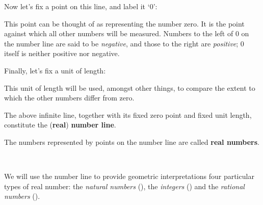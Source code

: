 Now let's fix a point on this line, and label it `$0$':
\begin{center}
\end{center}
This point can be thought of as representing the number zero. It is the point against which all other numbers will be measured. Numbers to the left of $0$ on the number line are said to be \textit{negative}, and those to the right are \textit{positive}; $0$ itself is neither positive nor negative.

Finally, let's fix a unit of length:
\begin{center}
\end{center}
This unit of length will be used, amongst other things, to compare the extent to which the other numbers differ from zero.

\begin{definition}
\label{defNumberLine}
The above infinite line, together with its fixed zero point and fixed unit length, constitute the (\textbf{real}) \textbf{number line}.

The numbers represented by points on the number line are called \textbf{real numbers}.
\begin{center}
\end{center}
~
\end{definition}

We will use the number line to provide geometric interpretations four particular types of real number: the \textit{natural numbers} (), the \textit{integers} () and the \textit{rational numbers} ().

